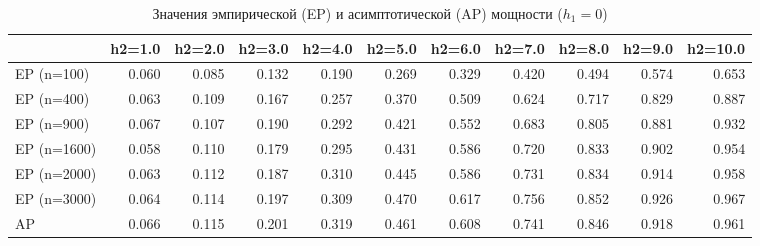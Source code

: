 \documentclass[12pt]{article}
\theoremstyle{break}
\newtheorem{example}{Пример}
\begin{document}
\begin{table}[!h]
	\caption{Значения эмпирической (EP) и асимптотической (AP) мощности ($h_1=0$)}
	\centering
	\hspace*{-1.0cm}\begin{tabular}
		{lrrrrrrrrrr}
		\toprule
		& h2=1.0 & h2=2.0 & h2=3.0 & h2=4.0 & h2=5.0 & h2=6.0 & h2=7.0 & h2=8.0 & h2=9.0 & h2=10.0\\
		\midrule
		EP (n=100) & 0.060 & 0.085 & 0.132 & 0.190 & 0.269 & 0.329 & 0.420 & 0.494 & 0.574 & 0.653\\
		EP (n=400) & 0.063 & 0.109 & 0.167 & 0.257 & 0.370 & 0.509 & 0.624 & 0.717 & 0.829 & 0.887\\
		EP (n=900) & 0.067 & 0.107 & 0.190 & 0.292 & 0.421 & 0.552 & 0.683 & 0.805 & 0.881 & 0.932\\
		EP (n=1600) & 0.058 & 0.110 & 0.179 & 0.295 & 0.431 & 0.586 & 0.720 & 0.833 & 0.902 & 0.954\\
		EP (n=2000) & 0.063 & 0.112 & 0.187 & 0.310 & 0.445 & 0.586 & 0.731 & 0.834 & 0.914 & 0.958\\
		EP (n=3000) & 0.064 & 0.114 & 0.197 & 0.309 & 0.470 & 0.617 & 0.756 & 0.852 & 0.926 & 0.967\\
		\addlinespace
		AP & 0.066 & 0.115 & 0.201 & 0.319 & 0.461 & 0.608 & 0.741 & 0.846 & 0.918 & 0.961\\
		\bottomrule
	\end{tabular}
	\label{tbl:ap_cauchy_h2_diff}
\end{table}


%
\end{document}
